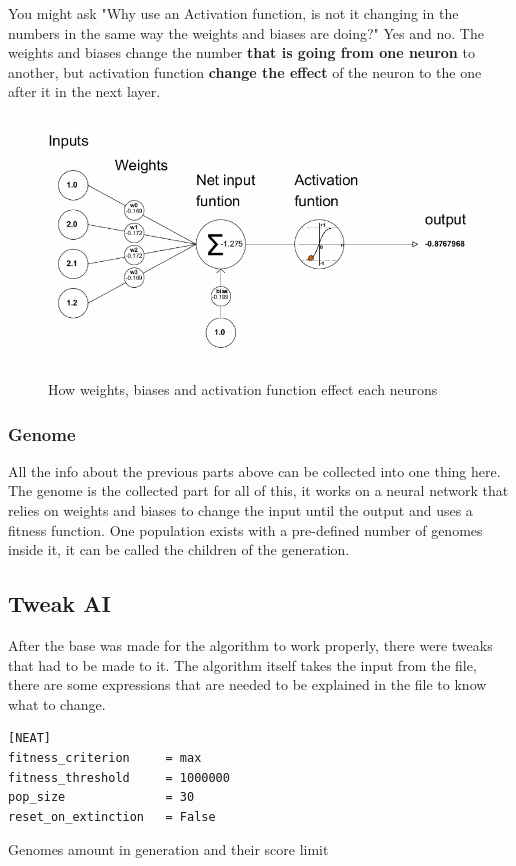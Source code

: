 You might ask "Why use an Activation function, is not it changing in the numbers in the same way the weights and biases are doing?" Yes and no. The weights and biases change the number \textbf{that is going from one neuron} to another, but activation function \textbf{change the effect} of the neuron to the one after it in the next layer.

\begin{figure}[H]
	\centering
	\includegraphics[width=0.7\linewidth]{usedImages/neuronsNN}
	\caption{How weights, biases and activation function effect each neurons}
	\label{fig:neuronsNN}
\end{figure}

\subsubsection{Genome}\label{sec:genome}
All the info about the previous parts above can be collected into one thing here. The genome is the collected part for all of this, it works on a neural network that relies on weights and biases to change the input until the output and uses a fitness function. One population exists with a pre-defined number of genomes inside it, it can be called the children of the generation.



\subsection{Tweak AI}\label{tweak-ai}

After the base was made for the algorithm to work properly, there were tweaks that had to be made to it. The algorithm itself takes the input from the  file, there are some expressions that are needed to be explained in the file to know what to change.

\begin{listing}[H]
\begin{verbatim}
[NEAT]
fitness_criterion     = max
fitness_threshold     = 1000000
pop_size              = 30
reset_on_extinction   = False
\end{verbatim}
\caption{Genomes amount in generation and their score limit}
\label{code:configGen}
\end{listing}


